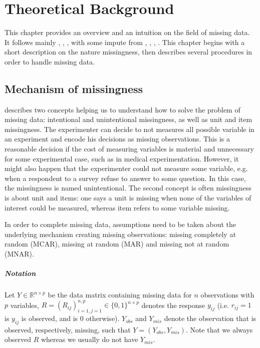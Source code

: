 \chapter{Theoretical Background}

This chapter provides an overview and an intuition on the field of missing
data. It follows mainly \cite{schafer2002missing},
\cite{little2002statistical}, \cite{van2012flexible}, with some impute from
\cite{wikipediaImputation2015}, \cite{matloffblog2015}, \cite{gelman2006data},
\cite{troyanskaya2001missing}. This chapter begins with a short description on
the nature missingness, then describes several procedures in order to handle
missing data.

\section{Mechanism of missingness}
\label{sec:source-missingness}

\cite{van2012flexible} describes two concepts helping us to understand how to
solve the problem of missing data: intentional and unintentional missingness,
as well as unit and item missingness. The experimenter can decide to not
measures all possible variable in an experiment and encode his decisions as
missing observations. This is a reasonable decision if the cost of measuring
variables is material and unnecessary for some experimental case, such as in
medical experimentation. However, it might also happen that the experimenter
could not measure some variable, e.g. when a respondent to a survey refuse to
answer to some question. In this case, the missingness is named
unintentional. The second concept is often missingness is about unit and items:
one says a unit is missing when none of the variables of interest could be
measured, whereas item refers to some variable missing.

In order to complete missing data, assumptions need to be taken about the
underlying mechanism creating missing observations: missing completely at
random (MCAR), missing at random (MAR) and missing not at random (MNAR).

\paragraph{Notation}

Let $Y \in \mathbb{R}^{n\times p}$ be the data matrix containing missing data
for $n$ observations with $p$ variables,
$R = (R_{ij})_{i=1,j=1}^{n,p} \in \{0, 1\}^{n\times p}$ denotes the response
$y_{ij}$ (i.e. $r_{ij} = 1$ is $y_{ij}$ is observed, and is $0$
otherwise). $Y_{obs}$ and $Y_{mis}$ denote the observation that is observed,
respectively, missing, such that $Y=(Y_{obs}, Y_{mis})$. Note that we always
observed $R$ whereas we usually do not have $Y_{mis}$.

